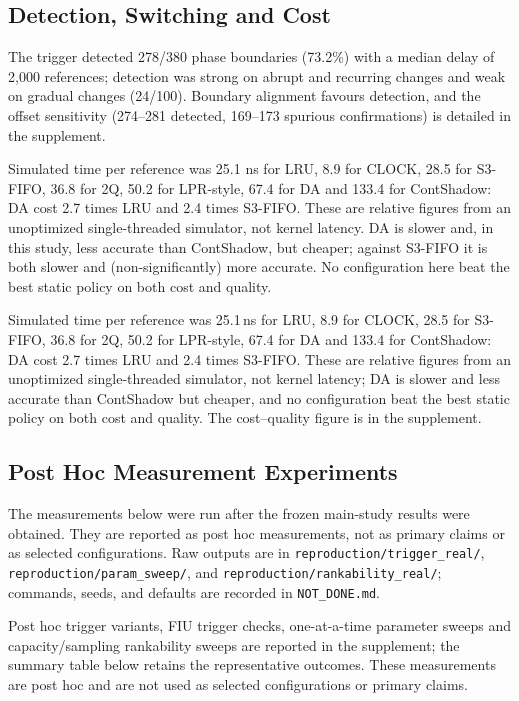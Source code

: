 \documentclass[10pt,twocolumn,a4paper]{IEEEtran}
\begin{document}
\subsection{Detection, Switching and Cost}

The trigger detected 278/380 phase boundaries (73.2\%) with a median delay of
2,000 references; detection was strong on abrupt and recurring changes and
weak on gradual changes (24/100). Boundary alignment favours detection, and
the offset sensitivity (274--281 detected, 169--173 spurious confirmations)
is detailed in the supplement.

Simulated time per reference was 25.1 ns for LRU, 8.9 for CLOCK, 28.5 for
S3-FIFO, 36.8 for 2Q, 50.2 for LPR-style, 67.4 for DA and 133.4 for
ContShadow: DA cost 2.7 times LRU and 2.4 times S3-FIFO. These are relative
figures from an unoptimized single-threaded simulator, not kernel latency. DA
is slower and, in this study, less accurate than ContShadow, but cheaper;
against S3-FIFO it is both slower and (non-significantly) more accurate. No
configuration here beat the best static policy on both cost and quality.

Simulated time per reference was 25.1\,ns for LRU, 8.9 for CLOCK, 28.5 for
S3-FIFO, 36.8 for 2Q, 50.2 for LPR-style, 67.4 for DA and 133.4 for
ContShadow: DA cost 2.7 times LRU and 2.4 times S3-FIFO. These are relative
figures from an unoptimized single-threaded simulator, not kernel latency; DA
is slower and less accurate than ContShadow but cheaper, and no configuration
beat the best static policy on both cost and quality. The cost--quality figure
is in the supplement.

\subsection{Post Hoc Measurement Experiments}
\label{sec:posthoc}
The measurements below were run after the frozen main-study results were
obtained. They are reported as post hoc measurements, not as primary
claims or as selected configurations. Raw outputs are in
\texttt{reproduction/trigger\_real/}, \texttt{reproduction/param\_sweep/},
and \texttt{reproduction/rankability\_real/}; commands, seeds, and defaults
are recorded in \texttt{NOT\_DONE.md}.

Post hoc trigger variants, FIU trigger checks, one-at-a-time parameter sweeps
and capacity/sampling rankability sweeps are reported in the supplement; the
summary table below retains the representative outcomes. These measurements
are post hoc and are not used as selected configurations or primary claims.
\end{document}
